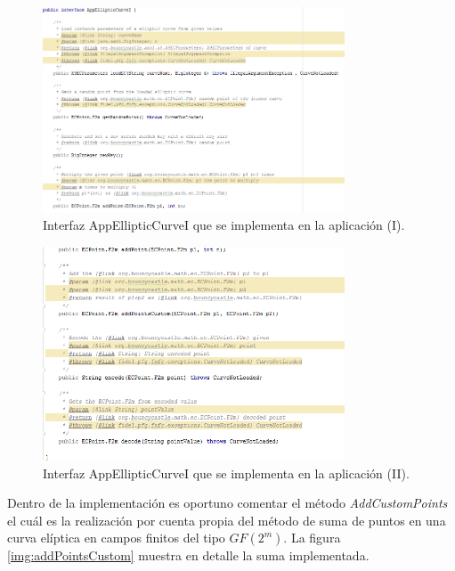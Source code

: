 \documentclass[../PFC.tex]{subfiles}
\begin{document}
\begin{figure}[H]
  \centering
  \includegraphics[width=0.8\textwidth]{./img/eci1}
  \caption{Interfaz AppEllipticCurveI que se implementa en la aplicación (I).}
  \label{img:eci1}
\end{figure}
 
\begin{figure}[H]
  \centering
  \includegraphics[width=0.8\textwidth]{./img/eci2}
  \caption{Interfaz AppEllipticCurveI que se implementa en la aplicación (II).}
  \label{img:eci2}
\end{figure}

Dentro de la implementación es oportuno comentar el método \textit{AddCustomPoints} el cuál es la realización por cuenta propia del método de suma de puntos en una curva elíptica en campos finitos del tipo \(GF(2^m)\). La figura \ref{img:addPointsCustom} muestra en detalle la suma implementada.
\end{document}
